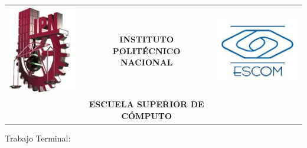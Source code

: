 \begin{titlepage}



\begin{center}
\begin{tabular}{r c l}
\includegraphics[scale=.25]{images/ipn.jpg} & \huge \textbf{INSTITUTO POLIT\'ECNICO NACIONAL} & \includegraphics[scale=.25]{images/escom.jpg}\\ 
& \Large \textbf{ESCUELA SUPERIOR DE C\'OMPUTO}
\end{tabular}
\end{center}


\vspace{1.5cm}
\begin{center}
\large Trabajo Terminal: \linebreak


\end{center}
\end{titlepage}
